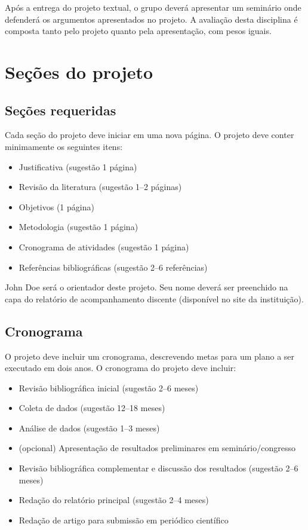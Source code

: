 \documentclass[a4paper]{article}
\begin{document}
Após a entrega do projeto textual, o grupo deverá apresentar um
seminário onde defenderá os argumentos apresentados no projeto. A
avaliação desta disciplina é composta tanto pelo projeto quanto pela
apresentação, com pesos iguais.

\section{Seções do projeto}

\subsection{Seções requeridas}

Cada seção do projeto deve iniciar em uma nova página. O projeto deve
conter minimamente os seguintes itens:

\begin{itemize}
\item Justificativa (sugestão 1 página)
\item Revisão da literatura (sugestão 1--2 páginas)
\item Objetivos (1 página)
\item Metodologia (sugestão 1 página)
\item Cronograma de atividades (sugestão 1 página)
\item Referências bibliográficas (sugestão 2--6 referências)
\end{itemize}

John Doe será o orientador deste projeto. Seu nome deverá ser
preenchido na capa do relatório de acompanhamento discente (disponível
no site da instituição).

\subsection{Cronograma}

O projeto deve incluir um cronograma, descrevendo metas para um plano
a ser executado em dois anos. O cronograma do projeto deve incluir:

\begin{itemize}
\item Revisão bibliográfica inicial (sugestão 2--6 meses)
\item Coleta de dados (sugestão 12--18 meses)
\item Análise de dados (sugestão 1--3 meses)
\item (opcional) Apresentação de resultados preliminares em
  seminário/congresso
\item Revisão bibliográfica complementar e discussão dos resultados
  (sugestão 2--6 meses)
\item Redação do relatório principal (sugestão 2--4 meses)
\item Redação de artigo para submissão em periódico científico
\end{itemize}
\end{document}
